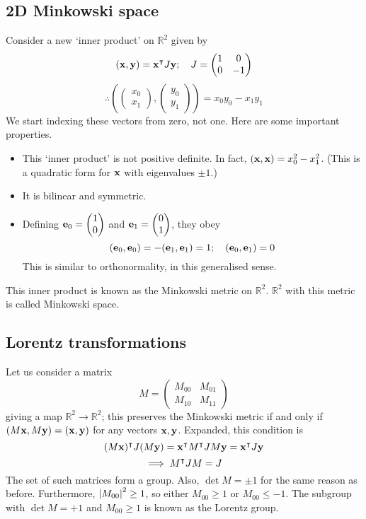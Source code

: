 \subsection{2D Minkowski space}
Consider a new `inner product' on \(\mathbb R^2\) given by
\[
	(\vb x, \vb y) = \vb x^\intercal J \vb y;\quad J = \begin{pmatrix}
		1 & 0 \\ 0 & -1
	\end{pmatrix}
\]
\[
	\therefore \left( \begin{pmatrix}
			x_0 \\ x_1
		\end{pmatrix}, \begin{pmatrix}
			y_0 \\ y_1
		\end{pmatrix} \right) = x_0 y_0 - x_1 y_1
\]
We start indexing these vectors from zero, not one.
Here are some important properties.
\begin{itemize}
	\item This `inner product' is not positive definite.
	      In fact, \((\vb x, \vb x) = x_0^2 - x_1^2\).
	      (This is a  quadratic form for \(\vb x\) with eigenvalues \(\pm 1\).)
	\item It is bilinear and symmetric.
	\item Defining \(\vb e_0 = \begin{pmatrix}
		      1 \\ 0
	      \end{pmatrix}\) and \(\vb e_1 = \begin{pmatrix}
		      0 \\ 1
	      \end{pmatrix}\), they obey
	      \[
		      (\vb e_0, \vb e_0) = -(\vb e_1, \vb e_1) = 1;\quad (\vb e_0, \vb e_1) = 0
	      \]
	      This is similar to orthonormality, in this generalised sense.
\end{itemize}
This inner product is known as the Minkowski metric on \(\mathbb R^2\).
\(\mathbb R^2\) with this metric is called Minkowski space.

\subsection{Lorentz transformations}
Let us consider a matrix
\[
	M = \begin{pmatrix}
		M_{00} & M_{01} \\
		M_{10} & M_{11}
	\end{pmatrix}
\]
giving a map \(\mathbb R^2 \to \mathbb R^2\); this preserves the Minkowski metric if and only if \((M\vb x, M\vb y) = (\vb x, \vb y)\) for any vectors \(\vb x, \vb y\).
Expanded, this condition is
\[
	(M\vb x)^\intercal J(M \vb y) = \vb x^\intercal M^\intercal J M \vb y = \vb x^\intercal J \vb y
\]
\[
	\implies M^\intercal J M = J
\]
The set of such matrices form a group.
Also, \(\det M = \pm 1\) for the same reason as before.
Furthermore, \(\abs{M_{00}}^2 \geq 1\), so either \(M_{00} \geq 1\) or \(M_{00} \leq -1\).
The subgroup with \(\det M = +1\) and \(M_{00} \geq 1\) is known as the Lorentz group.


